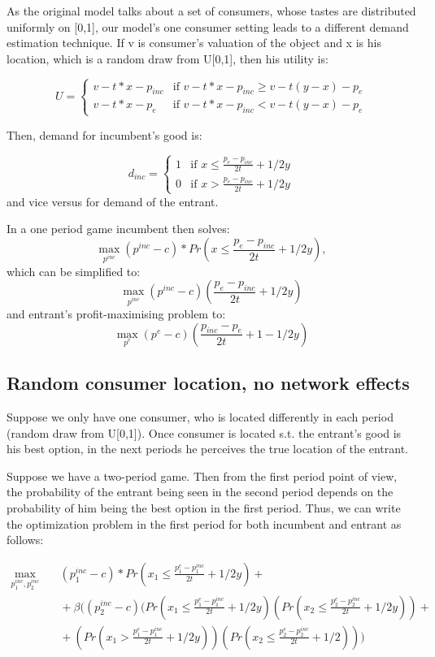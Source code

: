 \documentclass{article}
\begin{document}
As the original model talks about a set of consumers, whose tastes are distributed uniformly on [0,1], our model's one consumer setting leads to a different demand estimation technique. If v is consumer's valuation of the object and x is his location, which is a random draw from U[0,1], then his utility is:

    $$ U = \begin{cases}
    v - t*x - p_{inc} &  \text{if } v-t*x - p_{inc} \geq v - t(y-x) - p_{e}\\
    v - t*x - p_{e} &  \text{if } v-t*x - p_{inc} < v - t(y-x) - p_{e}
    \end{cases}
$$

Then, demand for incumbent's good is:

$$d_{inc} = \begin{cases}
    1 &  \text{if } x \leq \frac{p_{e}-p_{inc}}{2t} + 1/2y\\
    0 &  \text{if } x > \frac{p_{e}-p_{inc}}{2t} + 1/2y
    \end{cases}
$$
 and vice versus for demand of the entrant.
 
In a one period game incumbent then solves:
$$\max_{p^{inc}} (p^{inc}-c)* Pr(x \leq \frac{p_{e}-p_{inc}}{2t} + 1/2y),$$
which can be simplified to:
$$\max_{p^{inc}} (p^{inc}-c)(\frac{p_{e}-p_{inc}}{2t} + 1/2y)$$
and entrant's profit-maximising problem to:
$$\max_{p^{e}} (p^{e}-c)(\frac{p_{inc}-p_{e}}{2t} + 1 - 1/2y)$$

\subsection{Random consumer location, no network effects}
    
    Suppose we only have one consumer, who is located differently in each period (random draw from U[0,1]). Once consumer is located s.t. the entrant's good is his best option, in the next periods he perceives the true location of the entrant.
    
    Suppose we have a two-period game. Then from the first period point of view, the probability of the entrant being seen in the second period depends on the probability of him being the best option in the first period. Thus, we can write the optimization problem in the first period for both incumbent and entrant as follows:
    
    $$ \begin{aligned}
    \max_{p^{inc}_1, p^{inc}_2} {}
    & \quad (p^{inc}_1-c)* Pr(x_1 \leq \frac{p^{e}_1-p^{inc}_1}{2t} + 1/2y) + \\
    & \quad + \beta((p^{inc}_2-c)(Pr(x_1 \leq \frac{p^{e}_1-p^{inc}_1}{2t} + 1/2y)(Pr(x_2 \leq \frac{p^{e}_2-p^{inc}_2}{2t} + 1/2y)) + \\
    & \quad + (Pr(x_1 > \frac{p^{e}_1-p^{inc}_1}{2t} + 1/2y))(Pr(x_2 \leq \frac{p^{e}_2-p^{inc}_2}{2t} + 1/2)))
    \end{aligned}
    $$
\end{document}
